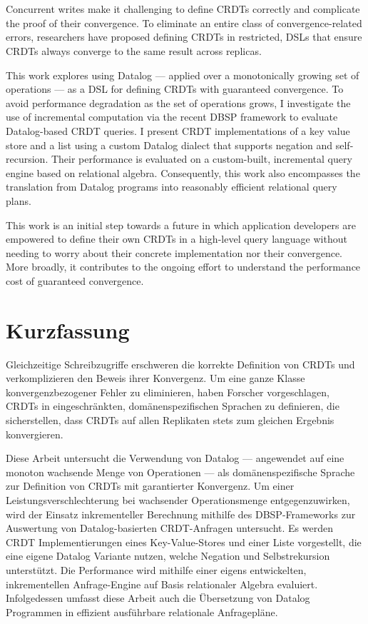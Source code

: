 \chapter{\abstractname}

Concurrent writes make it challenging to define \acsp{CRDT} correctly and
complicate the proof of their convergence.
To eliminate an entire class of convergence-related errors,
researchers have proposed defining \acsp{CRDT} in restricted,
\aclp{DSL} that ensure \acsp{CRDT} always converge to the same result across replicas.

This work explores using Datalog --- applied over a monotonically growing set of
operations --- as a \acl{DSL} for defining \acsp{CRDT} with guaranteed convergence.
To avoid performance degradation as the set of operations grows,
I investigate the use of incremental computation via the recent DBSP framework
to evaluate Datalog-based \acs{CRDT}  queries.
I present \acs{CRDT} implementations of a key value store and a list using a custom
Datalog dialect that supports negation and self-recursion.
Their performance is evaluated on a custom-built, incremental query engine based
on relational algebra.
Consequently, this work also encompasses the translation from Datalog programs
into reasonably efficient relational query plans.

This work is an initial step towards a future in which application developers are
empowered to define their own \acsp{CRDT} in a high-level query language without
needing to worry about their concrete implementation nor their convergence.
More broadly, it contributes to the ongoing effort to understand the performance
cost of guaranteed convergence.

\chapter{Kurzfassung}

Gleichzeitige Schreibzugriffe erschweren die korrekte Definition von CRDTs und
verkomplizieren den Beweis ihrer Konvergenz.
Um eine ganze Klasse konvergenzbezogener Fehler zu eliminieren,
haben Forscher vorgeschlagen, CRDTs in eingeschränkten, domänenspezifischen Sprachen
zu definieren, die sicherstellen, dass CRDTs auf allen Replikaten stets zum
gleichen Ergebnis konvergieren.

Diese Arbeit untersucht die Verwendung von Datalog --- angewendet auf eine monoton
wachsende Menge von Operationen --- als domänenspezifische Sprache zur Definition
von CRDTs mit garantierter Konvergenz.
Um einer Leistungsverschlechterung bei wachsender Operationsmenge entgegenzuwirken,
wird der Einsatz inkrementeller Berechnung mithilfe des DBSP-Frameworks zur
Auswertung von Datalog-basierten CRDT-Anfragen untersucht.
Es werden CRDT Implementierungen eines Key-Value-Stores und einer Liste vorgestellt,
die eine eigene Datalog Variante nutzen, welche Negation und Selbstrekursion unterstützt.
Die Performance wird mithilfe einer eigens entwickelten, inkrementellen Anfrage-Engine
auf Basis relationaler Algebra evaluiert.
Infolgedessen umfasst diese Arbeit auch die Übersetzung von Datalog Programmen
in effizient ausführbare relationale Anfragepläne.

